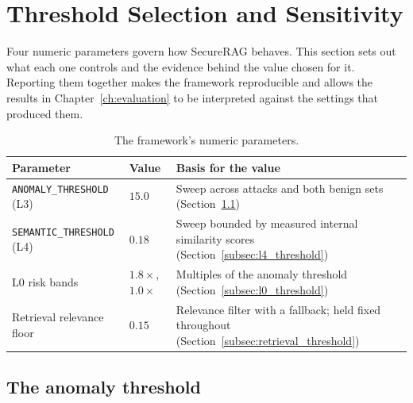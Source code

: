 %

\section{Threshold Selection and Sensitivity}
\label{sec:thresholds}

Four numeric parameters govern how SecureRAG behaves. This section sets out what each one controls and the evidence behind the value chosen for it. Reporting them together makes the framework reproducible and allows the results in Chapter~\ref{ch:evaluation} to be interpreted against the settings that produced them.

\begin{table}[h]
\centering
\caption{The framework's numeric parameters.}
\label{tab:thresholds}
\begin{tabular}{llp{6.4cm}}
\toprule
\textbf{Parameter} & \textbf{Value} & \textbf{Basis for the value} \\
\midrule
\texttt{ANOMALY\_THRESHOLD} (L3) & $15.0$ & Sweep across attacks and both benign sets (Section~\ref{subsec:l3_threshold}) \\
\texttt{SEMANTIC\_THRESHOLD} (L4) & $0.18$ & Sweep bounded by measured internal similarity scores (Section~\ref{subsec:l4_threshold}) \\
L0 risk bands & $1.8\times$, $1.0\times$ & Multiples of the anomaly threshold (Section~\ref{subsec:l0_threshold}) \\
Retrieval relevance floor & $0.15$ & Relevance filter with a fallback; held fixed throughout (Section~\ref{subsec:retrieval_threshold}) \\
\bottomrule
\end{tabular}
\end{table}

\subsection{The anomaly threshold}
\label{subsec:l3_threshold}

